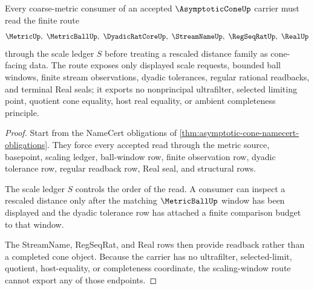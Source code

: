 \begin{theorem}
\label{thm:asymptotic-cone-scaling-window}
Every coarse-metric consumer of an accepted $\AsymptoticConeUp$ carrier must read the finite route
$$
\MetricUp,\ \MetricBallUp,\ \DyadicRatCoreUp,\ \StreamNameUp,\ \RegSeqRatUp,\ \RealUp
$$
through the scale ledger $S$ before treating a rescaled distance family as cone-facing data. The route exposes only displayed scale requests, bounded ball windows, finite stream observations, dyadic tolerances, regular rational readbacks, and terminal Real seals; it exports no nonprincipal ultrafilter, selected limiting point, quotient cone equality, host real equality, or ambient completeness principle.
\end{theorem}
\begin{proof}
Start from the NameCert obligations of \autoref{thm:asymptotic-cone-namecert-obligations}. They force every accepted read through the metric source, basepoint, scaling ledger, ball-window row, finite observation row, dyadic tolerance row, regular readback row, Real seal, and structural rows.

The scale ledger $S$ controls the order of the read. A consumer can inspect a rescaled distance only after the matching $\MetricBallUp$ window has been displayed and the dyadic tolerance row has attached a finite comparison budget to that window.

The StreamName, RegSeqRat, and Real rows then provide readback rather than a completed cone object. Because the carrier has no ultrafilter, selected-limit, quotient, host-equality, or completeness coordinate, the scaling-window route cannot export any of those endpoints.
\end{proof}



